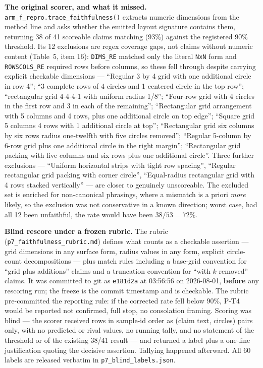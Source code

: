 \documentclass[11pt]{article}
\begin{document}
\textbf{The original scorer, and what it missed.} \texttt{arm\_f\_repro.trace\_faithfulness()} extracts numeric
dimensions from the method line and asks whether the emitted layout signature contains them,
returning 38 of 41 scoreable claims matching (93\%) against the registered 90\% threshold. Its 12
exclusions are regex coverage gaps, not claims without numeric content (Table~5, item 16):
\texttt{DIMS\_RE} matched only the literal \texttt{NxN} form and \texttt{ROWSCOLS\_RE} required rows before columns, so
these fell through despite carrying explicit checkable dimensions --- ``Regular 3 by 4 grid with
one additional circle in row 4''; ``3 complete rows of 4 circles and 1 centered circle in the top
row''; ``rectangular grid 4-4-4-1 with uniform radius 1/8''; ``Four-row grid with 4 circles in the
first row and 3 in each of the remaining''; ``Rectangular grid arrangement with 5 columns and 4
rows, plus one additional circle on top edge''; ``Square grid 5 columns 4 rows with 1 additional
circle at top''; ``Rectangular grid six columns by six rows radius one-twelfth with five circles
removed''; ``Regular 5-column by 6-row grid plus one additional circle in the right margin'';
``Rectangular grid packing with five columns and six rows plus one additional circle''. Three
further exclusions --- ``Uniform horizontal strips with tight row spacing'', ``Regular rectangular
grid packing with corner circle'', ``Equal-radius rectangular grid with 4 rows stacked vertically''
--- are closer to genuinely unscoreable. The excluded set is enriched for non-canonical phrasings,
where a mismatch is a priori \textit{more} likely, so the exclusion was not conservative in a known
direction; worst case, had all 12 been unfaithful, the rate would have been $38/53 = 72\%$.

\textbf{Blind rescore under a frozen rubric.} The rubric (\texttt{p7\_faithfulness\_rubric.md}) defines what
counts as a checkable assertion --- grid dimensions in any surface form, radius values in any
form, explicit circle-count decompositions --- plus match rules including a base-grid convention
for ``grid plus additions'' claims and a truncation convention for ``with $k$ removed'' claims. It was
committed to git as \texttt{e181d2a} at 03:56:56 on 2026-08-01, \textbf{before} any rescoring run; the
freeze is the commit timestamp and is checkable. The rubric pre-committed the reporting rule: if
the corrected rate fell below 90\%, P-T4 would be reported not confirmed, full stop, no
consolation framing. Scoring was blind --- the scorer received rows in sample-id order as (claim
text, circles) pairs only, with no predicted or rival values, no running tally, and no statement
of the threshold or of the existing 38/41 result --- and returned a label plus a one-line
justification quoting the decisive assertion. Tallying happened afterward. All 60 labels are
released verbatim in \texttt{p7\_blind\_labels.json}.
\end{document}
